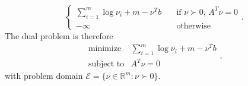 \documentclass[letterpaper,12pt]{article}
\begin{document}
\begin{enumerate}
\begin{equation*}
\begin{cases}
      \sum_{i=1}^m \log \nu_i + m - \nu^T b
        &\quad \text{if $\nu \succ 0$, $A^T \nu = 0$} \\
      -\infty &\quad \text{otherwise}
    \end{cases}.
  \end{equation*}
  The dual problem is therefore
  \begin{equation*}
    \begin{array}{ll}
      \text{minimize} & \sum_{i=1}^m \log \nu_i + m - \nu^T b \\
      \text{subject to}
        &A^T \nu = 0
    \end{array},
  \end{equation*}
  with problem domain
  $\mathcal{E} = \{\nu \in \mathbb{R}^m : \nu \succ 0\}$.

\end{enumerate}
\end{document}
